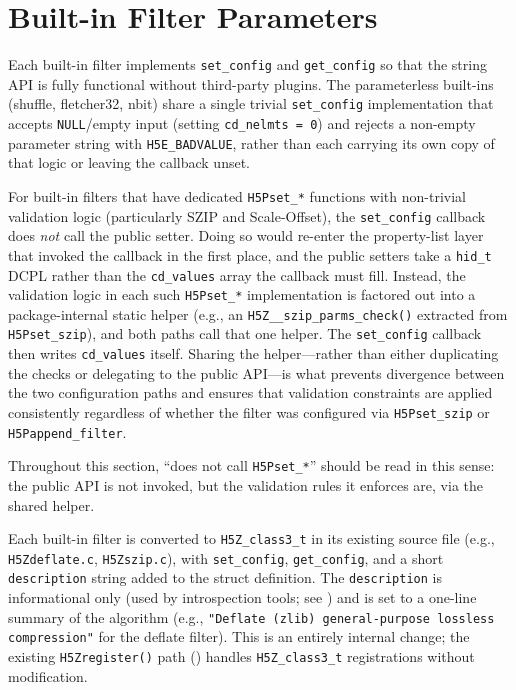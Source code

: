 \documentclass[../RFC-HDFG-2026-001.tex]{subfiles}
\begin{document}
\section{Built-in Filter Parameters}
\label{sec:builtin-filters}

Each built-in filter implements \texttt{set\_config} and \texttt{get\_config}
so that the string API is fully functional without third-party plugins.
The parameterless built-ins (shuffle, fletcher32, nbit) share a single
trivial \texttt{set\_config} implementation that accepts \texttt{NULL}/empty
input (setting \texttt{cd\_nelmts~=~0}) and rejects a non-empty parameter
string with \texttt{H5E\_BADVALUE}, rather than each carrying its own
copy of that logic or leaving the callback unset.

For built-in filters that have dedicated \texttt{H5Pset\_*} functions with non-trivial
validation logic (particularly SZIP and Scale-Offset), the \texttt{set\_config}
callback does \emph{not} call the public setter.  Doing so would re-enter the
property-list layer that invoked the callback in the first place, and the public
setters take a \texttt{hid\_t} DCPL rather than the \texttt{cd\_values} array the
callback must fill.  Instead, the validation logic in each such
\texttt{H5Pset\_*} implementation is factored out into a package-internal static
helper (e.g., an \texttt{H5Z\_\_szip\_parms\_check()} extracted from
\texttt{H5Pset\_szip}), and both paths call that one helper.  The
\texttt{set\_config} callback then writes \texttt{cd\_values} itself.  Sharing the
helper---rather than either duplicating the checks or delegating to the public
API---is what prevents divergence between the two configuration paths and
ensures that validation constraints are applied consistently regardless of
whether the filter was configured via \texttt{H5Pset\_szip} or
\texttt{H5Pappend\_filter}.

Throughout this section, ``does not call \texttt{H5Pset\_*}'' should be read in
this sense: the public API is not invoked, but the validation rules it enforces
are, via the shared helper.

Each built-in filter is converted to \texttt{H5Z\_class3\_t} in its existing
source file (e.g., \texttt{H5Zdeflate.c}, \texttt{H5Zszip.c}), with
\texttt{set\_config}, \texttt{get\_config}, and a short \texttt{description}
string added to the struct definition.  The \texttt{description} is
informational only (used by introspection tools; see
) and is set to a one-line summary of the
algorithm (e.g., \texttt{"Deflate (zlib) general-purpose lossless
compression"} for the deflate filter).  This is an entirely internal change;
the existing \texttt{H5Zregister()} path () handles
\texttt{H5Z\_class3\_t} registrations without modification.
\end{document}
